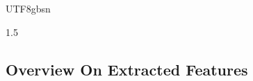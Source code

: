 \documentclass{article}
\begin{document}
\begin{CJK}{UTF8}{gbsn}
\begin{spacing}{1.5}
\subsection{Overview On Extracted Features}

\end{spacing}
\end{CJK}
\end{document}
